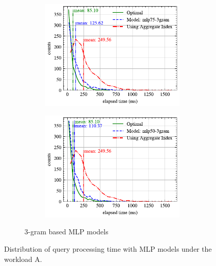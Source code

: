 \begin{figure}[!th]
\begin{subfigure}{0.45\textwidth}
		\begin{subfigure}{\textwidth}
			\centering
%			
			\includegraphics[]{my/graphics/perf_dist_mlp75_3gram_A.pdf}
		\end{subfigure}
		\vfill
		\begin{subfigure}{\textwidth}
			\centering
%			
			\includegraphics[]{my/graphics/perf_dist_mlp50_3gram_A.pdf}
		\end{subfigure}
		\caption{3-gram based MLP models}
	\end{subfigure}
	\caption{Distribution of query processing time with MLP models under the workload A.}
	\label{fig:mlp_perf_all_A}
\end{figure}
